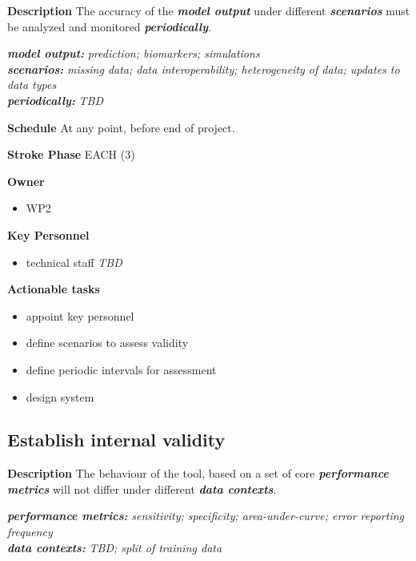 \documentclass[
  letterpaper,
  DIV=11,
  numbers=noendperiod]{scrreport}
\providecommand{\tightlist}{%
  \setlength{\itemsep}{0pt}\setlength{\parskip}{0pt}}\usepackage{longtable,booktabs,array}
\begin{document}
\textbf{Description} The accuracy of the \textbf{\emph{model output}}
under different \textbf{\emph{scenarios}} must be analyzed and monitored
\textbf{\emph{periodically}}.

\textbf{\emph{model output:}} \emph{prediction; biomarkers;
simulations}\\
\textbf{\emph{scenarios:}} \emph{missing data; data interoperability;
heterogeneity of data; updates to data types}\\
\textbf{\emph{periodically:}} \emph{TBD}

\textbf{Schedule} At any point, before end of project.

\textbf{Stroke Phase} EACH (3)

\textbf{Owner}

\begin{itemize}
\tightlist
\item
  WP2
\end{itemize}

\textbf{Key Personnel}

\begin{itemize}
\tightlist
\item
  technical staff \emph{TBD}
\end{itemize}

\textbf{Actionable tasks}

\begin{itemize}
\tightlist
\item
  appoint key personnel
\item
  define scenarios to assess validity
\item
  define periodic intervals for assessment
\item
  design system
\end{itemize}

\hypertarget{establish-internal-validity}{%
\subsection{Establish internal
validity}\label{establish-internal-validity}}

\textbf{Description} The behaviour of the tool, based on a set of core
\textbf{\emph{performance metrics}} will not differ under different
\textbf{\emph{data contexts}}.

\textbf{\emph{performance metrics:}} \emph{sensitivity; specificity;
area-under-curve; error reporting frequency}\\
\textbf{\emph{data contexts:}} \emph{TBD; split of training data}
\end{document}
